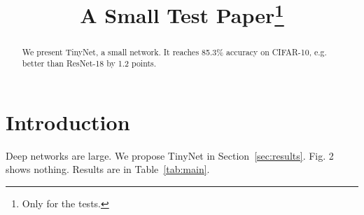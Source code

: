 \documentclass{article}
\title{A Small Test Paper\thanks{Only for the tests.}}
\newcommand{\ours}{TinyNet}
\begin{document}
\maketitle
\begin{abstract}
We present \ours, a small network. It reaches 85.3\% accuracy on CIFAR-10, e.g. better than ResNet-18 by 1.2 points. %
\end{abstract}

\section{Introduction}
Deep networks are large. %
We propose \ours{} in Section~\ref{sec:results}. Fig. 2 shows nothing.
Results are in Table~\ref{tab:main}.


\end{document}
